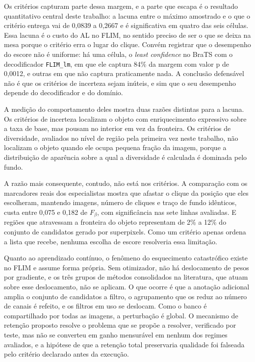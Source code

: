 Os critérios capturam parte dessa margem, e a parte que escapa é o resultado quantitativo central deste trabalho: a lacuna entre o máximo amostrado e o que o critério entrega vai de 0,0839 a 0,2667 e é significativa em quatro das seis células. Essa lacuna é o custo do \ac{AL} no \ac{FLIM}, no sentido preciso de ser o que se deixa na mesa porque o critério erra o lugar do clique. Convém registrar que o desempenho do escore não é uniforme: há uma célula, o \textit{least confidence} no BraTS com o decodificador \texttt{FLIM\_lm}, em que ele captura 84\% da margem com valor p de 0,0012, e outras em que não captura praticamente nada. A conclusão defensável não é que os critérios de incerteza sejam inúteis, e sim que o seu desempenho depende do decodificador e do domínio.

A medição do comportamento deles mostra duas razões distintas para a lacuna. Os critérios de incerteza localizam o objeto com enriquecimento expressivo sobre a taxa de base, mas pousam no interior em vez da fronteira. Os critérios de diversidade, avaliados no nível de região pela primeira vez neste trabalho, não localizam o objeto quando ele ocupa pequena fração da imagem, porque a distribuição de aparência sobre a qual a diversidade é calculada é dominada pelo fundo.

A razão mais consequente, contudo, não está nos critérios. A comparação com os marcadores reais dos especialistas mostra que afastar o clique da posição que eles escolheram, mantendo imagens, número de cliques e traço de fundo idênticos, custa entre 0,075 e 0,182 de $F_\beta$, com significância nas sete linhas avaliadas. E regiões que atravessam a fronteira do objeto representam de 2\% a 12\% do conjunto de candidatos gerado por superpixels. Como um critério apenas ordena a lista que recebe, nenhuma escolha de escore resolveria essa limitação.

Quanto ao aprendizado contínuo, o fenômeno do esquecimento catastrófico existe no \ac{FLIM} e assume forma própria. Sem otimizador, não há deslocamento de pesos por gradiente, e os três grupos de métodos consolidados na literatura, que atuam sobre esse deslocamento, não se aplicam. O que ocorre é que a anotação adicional amplia o conjunto de candidatos a filtro, o agrupamento que os reduz ao número de canais é refeito, e os filtros em uso se deslocam. Como o banco é compartilhado por todas as imagens, a perturbação é global. O mecanismo de retenção proposto resolve o problema que se propõe a resolver, verificado por teste, mas não se converteu em ganho mensurável em nenhum dos regimes avaliados, e a hipótese de que a retenção total preservaria qualidade foi falseada pelo critério declarado antes da execução.

